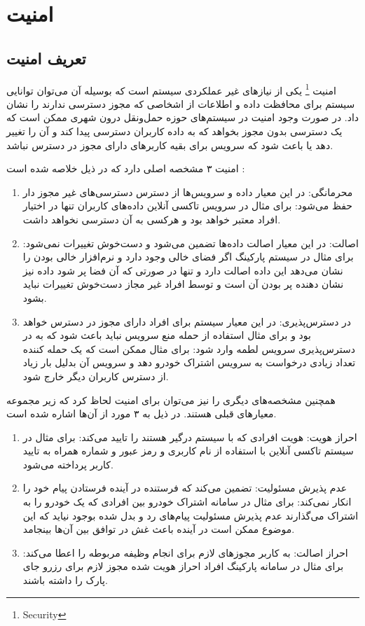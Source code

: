 \chapter{امنیت}
\section{تعریف امنیت}
امنیت \footnote{Security}
یکی از نیازهای غیر عملکردی سیستم است که بوسیله آن می‌توان توانایی سیستم برای محافظت داده و اطلاعات از اشخاصی که مجوز دسترسی ندارند را نشان داد.
در صورت وجود امنیت در سیستم‌‌های حوزه حمل‌ونقل درون شهری ممکن است که یک دسترسی بدون مجوز بخواهد که به داده کاربران دسترسی پیدا کند و آن را تغییر دهد یا باعث شود که سرویس برای بقیه کاربرهای دارای مجوز در دسترس نباشد.

امنیت ۳ مشخصه اصلی دارد که در ذیل خلاصه شده است \cite{sec_3_princilpe}:
\begin{enumerate}
\item
محرمانگی: در این معیار داده و سرویس‌ها از دسترس دسترسی‌های غیر مجوز دار حفظ می‌شود: برای مثال در سرویس تاکسی آنلاین داده‌های کاربران تنها در اختیار افراد معتبر خواهد بود و هرکسی به آن دسترسی نخواهد داشت.
\item
اصالت: در این معیار اصالت داده‌ها تضمین می‌شود و دست‌خوش تغییرات نمی‌شود: برای مثال در سیستم پارکینگ اگر فضای خالی وجود دارد و نرم‌افزار خالی بودن را نشان می‌دهد این داده اصالت دارد و تنها در صورتی که آن فضا پر شود داده نیز نشان دهنده پر بودن آن است و توسط افراد غیر مجاز دست‌خوش تغییرات نباید بشود.
\item 
در دسترس‌پذیری: در این معیار سیستم برای افراد دارای مجوز در دسترس خواهد بود و برای مثال استفاده از حمله منع سرویس نباید باعث شود که به در دسترس‌پذیری سرویس لطمه وارد شود: برای مثال ممکن است که یک حمله کننده تعداد زیادی درخواست به سرویس اشتراک خودرو دهد و سرویس آن بدلیل بار زیاد از دسترس کاربران دیگر خارج شود.
\end{enumerate}

همچنین مشخصه‌های دیگری را نیز می‌توان برای امنیت لحاظ کرد که زیر مجموعه‌ معیارهای قبلی هستند. 
در ذیل به ۳ مورد از آن‌ها اشاره شده است.
\begin{enumerate}
\item
احراز هویت: هویت افرادی که با سیستم درگیر هستند را تایید می‌کند: برای مثال در سیستم تاکسی آنلاین با استفاده از نام کاربری و رمز عبور و شماره همراه به تایید کاربر پرداخته می‌شود.
\item
عدم پذیرش مسئولیت: 
تضمین می‌کند که فرستنده در آینده فرستادن پیام خود را انکار نمی‌کند: برای مثال در سامانه اشتراک خودرو بین افرادی که یک خودرو را به اشتراک می‌گذارند عدم پذیرش مسئولیت پیام‌های رد و بدل شده بوجود نیاید که این موضوع ممکن است در آینده باعث غش در توافق بین‌ آن‌ها بینجامد.
\item
احراز اصالت: به کاربر مجوزهای لازم برای انجام وظیفه مربوطه را اعطا می‌کند: برای مثال در سامانه پارکینگ افراد احراز هویت شده مجوز لازم برای رزرو جای پارک را داشته باشند.
\end{enumerate}

